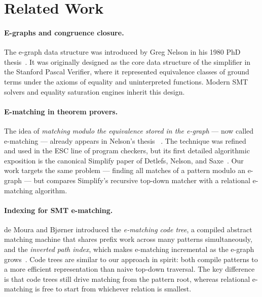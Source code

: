 \section{Related Work}
\label{sec:related}

\paragraph{E-graphs and congruence closure.}
The e-graph data structure was introduced by Greg Nelson in his 1980 PhD
thesis~\cite{nelson1980}. It was originally
designed as the core data structure of the simplifier in the Stanford Pascal
Verifier, where it represented equivalence classes of ground terms under the
axioms of equality and uninterpreted functions. Modern SMT solvers and
equality saturation engines inherit this design.

\paragraph{E-matching in theorem provers.}
The idea of \emph{matching modulo the equivalence stored in the e-graph} --- now
called e-matching --- already appears in Nelson's thesis~\cite{nelson1980} . The
technique was refined and used in the ESC line of program checkers, but its
first detailed algorithmic exposition is the canonical Simplify paper of
Detlefs, Nelson, and Saxe~\cite{simplify}. Our work targets the same problem ---
finding all matches of a pattern modulo an e-graph --- but compares Simplify's
recursive top-down matcher with a relational e-matching algorithm.

\paragraph{Indexing for SMT e-matching.}
de Moura and Bj{\o}rner introduced the \emph{e-matching code tree}, a compiled
abstract matching machine that shares prefix work across many patterns
simultaneously, and the \emph{inverted path index}, which makes e-matching
incremental as the e-graph grows~\cite{ematchingz3}. Code trees are similar to
our approach in spirit: both compile patterns to a more efficient representation
than naive top-down traversal. The key difference is that code trees still drive
matching from the pattern root, whereas relational e-matching is free to start
from whichever relation is smallest.

